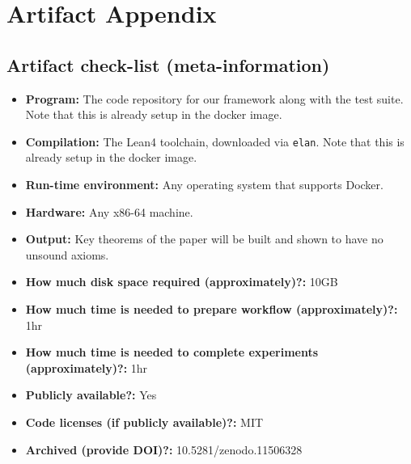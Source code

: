 \documentclass{sigplanconf}
\begin{document}


\appendix
\section{Artifact Appendix}



\subsection{Artifact check-list (meta-information)}


{\small
\begin{itemize}
  \item {\bf Program: } The code repository for our framework along with the test suite. Note that this is already setup in the docker image.
  \item {\bf Compilation: } The Lean4 toolchain, downloaded via \texttt{elan}. Note that this is already setup in the docker image.
  \item {\bf Run-time environment: } Any operating system that supports Docker.
  \item {\bf Hardware: } Any x86-64 machine.
  \item {\bf Output: } Key theorems of the paper will be built and shown to have no unsound axioms.
  \item {\bf How much disk space required (approximately)?: } 10GB
  \item {\bf How much time is needed to prepare workflow (approximately)?: } 1hr
  \item {\bf How much time is needed to complete experiments (approximately)?: } 1hr
  \item {\bf Publicly available?: } Yes
  \item {\bf Code licenses (if publicly available)?: } MIT
  \item {\bf Archived (provide DOI)?: } 10.5281/zenodo.11506328
\end{itemize}
}
\end{document}
